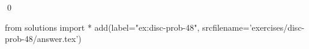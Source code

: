 
\begin{ex} 
  \label{ex:disc-prob-48}
  
  \qed
\end{ex} 
\begin{python0}
from solutions import *
add(label="ex:disc-prob-48",
    srcfilename='exercises/disc-prob-48/answer.tex') 
\end{python0}
